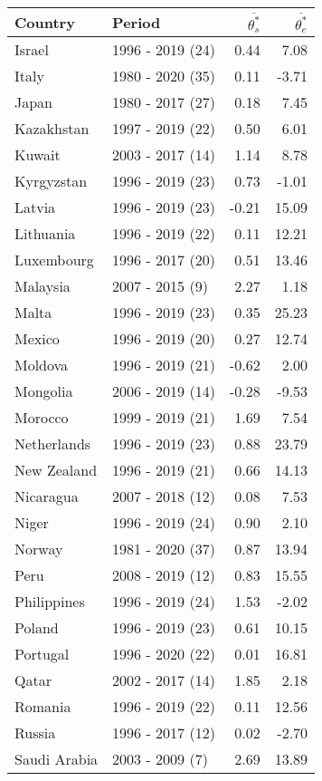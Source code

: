 \begin{table}[pos=h]
{{\centering 
\begin{tabular}{llrr} \toprule
Country & Period & $\overline{\theta^*_s}$ & $\overline{\theta^*_c}$\\
\midrule
Israel & 1996 - 2019 (24) & 0.44 & 7.08\\
Italy & 1980 - 2020 (35) & 0.11 & -3.71\\
Japan & 1980 - 2017 (27) & 0.18 & 7.45\\
Kazakhstan & 1997 - 2019 (22) & 0.50 & 6.01\\
Kuwait & 2003 - 2017 (14) & 1.14 & 8.78\\
\addlinespace
Kyrgyzstan & 1996 - 2019 (23) & 0.73 & -1.01\\
Latvia & 1996 - 2019 (23) & -0.21 & 15.09\\
Lithuania & 1996 - 2019 (22) & 0.11 & 12.21\\
Luxembourg & 1996 - 2017 (20) & 0.51 & 13.46\\
Malaysia & 2007 - 2015 (9) & 2.27 & 1.18\\
\addlinespace
Malta & 1996 - 2019 (23) & 0.35 & 25.23\\
Mexico & 1996 - 2019 (20) & 0.27 & 12.74\\
Moldova & 1996 - 2019 (21) & -0.62 & 2.00\\
Mongolia & 2006 - 2019 (14) & -0.28 & -9.53\\
Morocco & 1999 - 2019 (21) & 1.69 & 7.54\\
\addlinespace
Netherlands & 1996 - 2019 (23) & 0.88 & 23.79\\
New Zealand & 1996 - 2019 (21) & 0.66 & 14.13\\
Nicaragua & 2007 - 2018 (12) & 0.08 & 7.53\\
Niger & 1996 - 2019 (24) & 0.90 & 2.10\\
Norway & 1981 - 2020 (37) & 0.87 & 13.94\\
\addlinespace
Peru & 2008 - 2019 (12) & 0.83 & 15.55\\
Philippines & 1996 - 2019 (24) & 1.53 & -2.02\\
Poland & 1996 - 2019 (23) & 0.61 & 10.15\\
Portugal & 1996 - 2020 (22) & 0.01 & 16.81\\
Qatar & 2002 - 2017 (14) & 1.85 & 2.18\\
\addlinespace
Romania & 1996 - 2019 (22) & 0.11 & 12.56\\
Russia & 1996 - 2017 (12) & 0.02 & -2.70\\
Saudi Arabia & 2003 - 2009 (7) & 2.69 & 13.89\\

\end{tabular}}}
\end{table}
